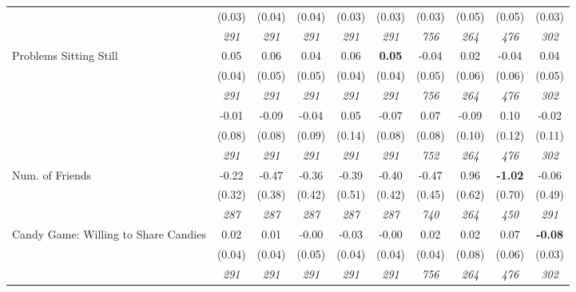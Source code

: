 \begin{tabular}{l c c c c c c c c c}
& (0.03) & (0.04) & (0.04) & (0.03) & (0.03) & (0.03) & (0.05) & (0.05) & (0.03) \\
& \textit{ 291 } & \textit{ 291 } & \textit{ 291 } & \textit{ 291 } & \textit{ 291 } & \textit{ 756 } & \textit{ 264 } & \textit{ 476 } & \textit{ 302 } \\
Problems Sitting Still & 0.05 & 0.06 & 0.04 & 0.06 & \textbf{0.05} & -0.04 & 0.02 & -0.04 & 0.04 \\
& (0.04) & (0.05) & (0.05) & (0.04) & (0.04) & (0.05) & (0.06) & (0.06) & (0.05) \\
& \textit{ 291 } & \textit{ 291 } & \textit{ 291 } & \textit{ 291 } & \textit{ 291 } & \textit{ 756 } & \textit{ 264 } & \textit{ 476 } & \textit{ 302 } \\
& -0.01 & -0.09 & -0.04 & 0.05 & -0.07 & 0.07 & -0.09 & 0.10 & -0.02 \\
& (0.08) & (0.08) & (0.09) & (0.14) & (0.08) & (0.08) & (0.10) & (0.12) & (0.11) \\
& \textit{ 291 } & \textit{ 291 } & \textit{ 291 } & \textit{ 291 } & \textit{ 291 } & \textit{ 752 } & \textit{ 264 } & \textit{ 476 } & \textit{ 302 } \\
Num. of Friends & -0.22 & -0.47 & -0.36 & -0.39 & -0.40 & -0.47 & 0.96 & \textbf{ -1.02 } & -0.06 \\
& (0.32) & (0.38) & (0.42) & (0.51) & (0.42) & (0.45) & (0.62) & (0.70) & (0.49) \\
& \textit{ 287 } & \textit{ 287 } & \textit{ 287 } & \textit{ 287 } & \textit{ 287 } & \textit{ 740 } & \textit{ 264 } & \textit{ 450 } & \textit{ 291 } \\
Candy Game: Willing to Share Candies & 0.02 & 0.01 & -0.00 & -0.03 & -0.00 & 0.02 & 0.02 & 0.07 & \textbf{-0.08} \\
& (0.04) & (0.04) & (0.05) & (0.04) & (0.04) & (0.04) & (0.08) & (0.06) & (0.03) \\
& \textit{ 291 } & \textit{ 291 } & \textit{ 291 } & \textit{ 291 } & \textit{ 291 } & \textit{ 756 } & \textit{ 264 } & \textit{ 476 } & \textit{ 302 } \\
\bottomrule
\end{tabular}
